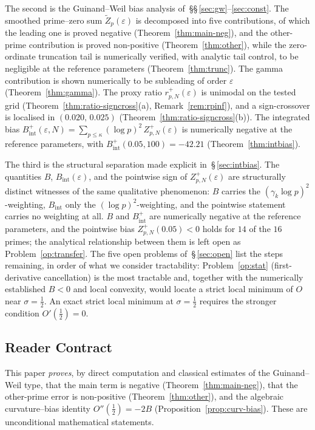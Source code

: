 \documentclass[11pt]{article}
\begin{document}
The second is the Guinand--Weil bias analysis of~\S\S\,\ref{sec:gw}--\ref{sec:const}.
The smoothed prime--zero sum $\widetilde Z_p(\varepsilon)$ is decomposed into
five contributions, of which the leading one is proved negative
(Theorem~\ref{thm:main-neg}), and the other-prime contribution is proved non-positive
(Theorem~\ref{thm:other}), while the zero-ordinate truncation
tail is numerically verified, with analytic tail control, to be
negligible at the reference parameters
(Theorem~\ref{thm:trunc}).
The gamma contribution is shown numerically to be subleading of order
$\varepsilon$ (Theorem~\ref{thm:gamma}).
The proxy ratio $r^+_{p,N}(\varepsilon)$ is unimodal on the tested grid
(Theorem~\ref{thm:ratio-signcross}(a), Remark~\ref{rem:rpinf}), and a sign-crossover
is localised in $(0.020,\,0.025)$
(Theorem~\ref{thm:ratio-signcross}(b)).
The integrated bias
$B_{\mathrm{int}}^+(\varepsilon,N)=\sum_{p\le\kappa}(\log p)^2\,
Z_{p,N}^+(\varepsilon)$ is numerically negative at the
reference parameters, with $B_{\mathrm{int}}^+(0.05,100)=-42.21$
(Theorem~\ref{thm:intbias}).

The third is the structural separation made explicit in~\S\,\ref{sec:intbias}.
The quantities $B$, $B_{\mathrm{int}}(\varepsilon)$, and the pointwise
sign of $Z_{p,N}^+(\varepsilon)$ are structurally distinct
witnesses of the same qualitative phenomenon: $B$ carries the
$(\gamma_k\log p)^2$-weighting, $B_{\mathrm{int}}$ only the
$(\log p)^2$-weighting, and the pointwise statement carries no
weighting at all.
$B$ and $B^+_{\mathrm{int}}$ are numerically negative at the reference parameters,
and the pointwise bias $Z_{p,N}^+(0.05)<0$ holds for $14$ of the $16$ primes; the
analytical relationship between them is left open as
Problem~\ref{op:transfer}.
The five open problems of~\S\,\ref{sec:open} list the steps remaining,
in order of what we consider tractability:
Problem~\ref{op:stat} (first-derivative cancellation) is the most tractable and,
together with the numerically established $B<0$ and local convexity,
would locate a strict local minimum of $O$ near $\sigma=\tfrac12$.
An exact strict local minimum at $\sigma=\tfrac12$ requires the
stronger condition $O'(\tfrac12)=0$.

\subsection{Reader Contract}

This paper \emph{proves}, by direct computation and classical estimates
of the Guinand--Weil type, that the main term is negative
(Theorem~\ref{thm:main-neg}), that the other-prime error is
non-positive (Theorem~\ref{thm:other}), and the algebraic
curvature--bias identity $O''(\tfrac12)=-2B$
(Proposition~\ref{prop:curv-bias}).
These are unconditional mathematical statements.
\end{document}
